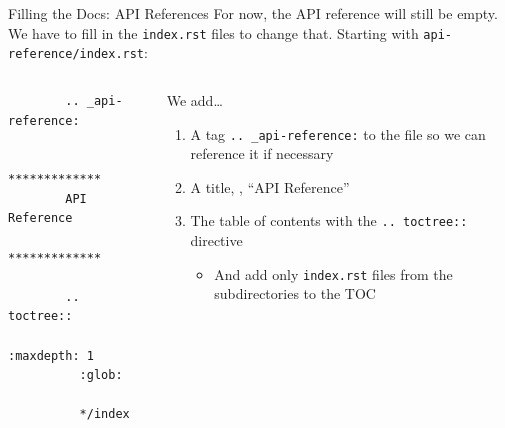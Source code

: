 \begin{darkframe}[fragile]{Filling the Docs: API References}
  For now, the API reference will still be empty. We have to fill in
  the \texttt{index.rst} files to change that. Starting with
  \texttt{api-reference/index.rst}:\\[1em]

  \begin{columns}[onlytextwidth]
    \begin{column}{0.38\textwidth}
      \begin{verbatim}
        .. _api-reference:

        *************
        API Reference
        *************

        .. toctree::
          :maxdepth: 1
          :glob:

          */index
      \end{verbatim}
    \end{column}
    \hfill
    \begin{column}{0.58\textwidth}
      We add\dots
      \begin{enumerate}
        \setlength{\itemsep}{1.5em}
        \item A tag \texttt{.. \_api-reference:} to the file so we can reference it if necessary
        \item A title, \eg, \enquote{API Reference}
        \item The table of contents with the \texttt{.. toctree::} directive
          \begin{itemize}
            \item And add only \texttt{index.rst} files from the subdirectories to the TOC
          \end{itemize}
      \end{enumerate}
    \end{column}
  \end{columns}
\end{darkframe}

